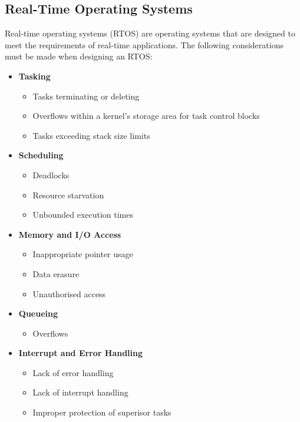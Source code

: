 \documentclass{article}
\begin{document}
\subsection{Real-Time Operating Systems}
Real-time operating systems (RTOS) are operating systems that are
designed to meet the requirements of real-time applications. The
following considerations must be made when designing an RTOS:
\begin{itemize}
    \item \textbf{Tasking}
          \begin{itemize}
              \item Tasks terminating or deleting
              \item Overflows within a kernel's storage area for task
                    control blocks
              \item Tasks exceeding stack size limits
          \end{itemize}
    \item \textbf{Scheduling}
          \begin{itemize}
              \item Deadlocks
              \item Resource starvation
              \item Unbounded execution times
          \end{itemize}
    \item \textbf{Memory and I/O Access}
          \begin{itemize}
              \item Inappropriate pointer usage
              \item Data erasure
              \item Unauthorised access
          \end{itemize}
    \item \textbf{Queueing}
          \begin{itemize}
              \item Overflows
          \end{itemize}
    \item \textbf{Interrupt and Error Handling}
          \begin{itemize}
              \item Lack of error handling
              \item Lack of interrupt handling
              \item Improper protection of superisor tasks
          \end{itemize}
\end{itemize}
\end{document}
